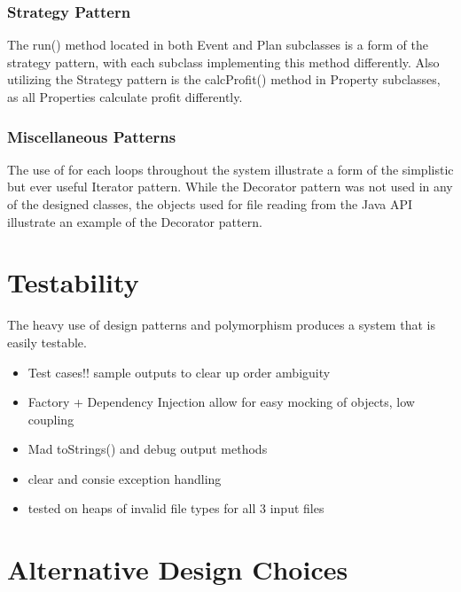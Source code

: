 \documentclass[]{article}
\begin{document}
\subsubsection*{Strategy Pattern}

The run() method located in both Event and Plan subclasses is a form of the strategy pattern, with each subclass implementing this method differently. Also utilizing the Strategy pattern is the calcProfit() method in Property subclasses, as all Properties calculate profit differently.

\subsubsection*{Miscellaneous Patterns}

The use of for each loops throughout the system illustrate a form of the simplistic but ever useful Iterator pattern. While the Decorator pattern was not used in any of the designed classes, the objects used for file reading from the Java API illustrate an example of the Decorator pattern.


\section*{Testability}

The heavy use of design patterns and polymorphism produces a system that is easily testable.

\begin{itemize}
	\item Test cases!! sample outputs to clear up order ambiguity
	\item Factory  + Dependency Injection allow for easy mocking of objects, low coupling
	\item Mad toStrings() and debug output methods
	\item clear and consie exception handling
	\item tested on heaps of invalid file types for all 3 input files
\end{itemize}


\section*{Alternative Design Choices}
\end{document}
